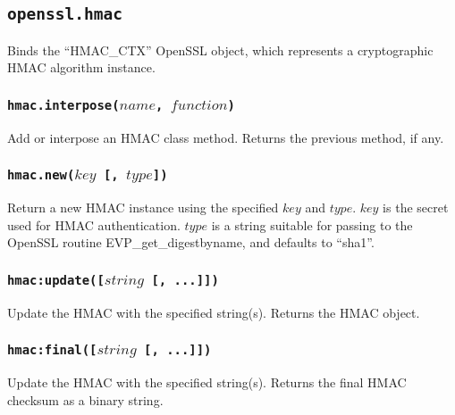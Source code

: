\documentclass[11pt, oneside]{memoir}
\newcommand*{\fn}[1]{\texttt{#1}\xspace}
\newcounter{toccols}
\newenvironment{Module}[1]{
	\subsection{\texttt{#1}}
	\addtocontents{toc}{
		\protect\begin{multicols}{\value{toccols}}
	}
}{
	\addtocontents{toc}{\protect\end{multicols}}
}
\begin{document}
\begin{Module}{openssl.hmac}

Binds the ``HMAC\_CTX'' OpenSSL object, which represents a cryptographic HMAC algorithm instance.

\subsubsection[\fn{hmac.interpose}]{\fn{hmac.interpose($name$, $function$)}}

Add or interpose an HMAC class method. Returns the previous method, if any.

\subsubsection[\fn{hmac.new}]{\fn{hmac.new($key$ [, $type$])}}

Return a new HMAC instance using the specified $key$ and $type$. $key$ is the secret used for HMAC authentication. $type$ is a string suitable for passing to the OpenSSL routine EVP\_get\_digestbyname, and defaults to ``sha1''.

\subsubsection[\fn{hmac:update}]{\fn{hmac:update([$string$ [, ...]])}}

Update the HMAC with the specified string(s). Returns the HMAC object.

\subsubsection[\fn{hmac:final}]{\fn{hmac:final([$string$ [, ...]])}}

Update the HMAC with the specified string(s). Returns the final HMAC checksum as a binary string.

\end{Module}
\end{document}
